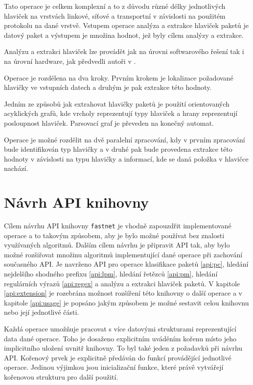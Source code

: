 Tato operace je celkem komplexní a to z důvodu různé délky jednotlivých hlaviček na vrstvách
linkové, síťové a transportní v závislosti na použitém protokolu na dané vrstvě.
Vstupem operace analýza a extrakce hlaviček paketů je datový paket a výstupem je
množina hodnot, jež byly cílem analýzy a extrakce.

Analýzu a extrakci hlaviček lze provádět jak na úrovni softwarového řešení tak i na úrovní hardware,
jak předvedli autoři v \cite{phe}.

Operace je rozdělena na dva kroky. Prvním krokem je lokalizace požadované hlavičky ve vstupních datech
a druhým je pak extrakce této hodnoty.

Jedním ze způsobů jak extrahovat hlavičky paketů je použití orientovaných acyklických grafů,
kde vrcholy reprezentují typy hlaviček a hrany reprezentují posloupnost hlaviček.
Parsovací graf je převeden na konečný automat.

Operace je možné rozdělit na dvě paralelní zpracování,
kdy v prvním zpracování bude identifikován typ hlavičky a v druhé pak bude provedena extrakce
této hodnoty v závislosti na typu hlavičky a informací, kde se daná položka v hlavičce nachází.

\chapter{Návrh API knihovny}\label{chapter:api} %

Cílem návrhu API knihovny \texttt{fastnet} je vhodně zapouzdřit implementované operace a to takovým způsobem,
aby je bylo možné používat bez znalosti využívaných algoritmů. Dalším cílem návrhu je připravit API tak,
aby bylo možné rozšiřovat množinu algoritmů implementující dané operace při zachování
současného API. Je navrženo API pro operace klasifikace paketů \ref{api:pc}, hledání nejdelšího shodného prefixu
\ref{api:lpm}, hledání řetězců \ref{api:pm}, hledání regulárních výrazů \ref{api:regex} a analýzu a
extrakci hlaviček paketů. V kapitole \ref{api:extension} je rozebrána možnost rozšíření této knihovny o další operace a v kapitole \ref{api:usage} je popsáno jakým způsobem je možné sestavit celou knihovnu nebo její jednotlivé
části.

Každá operace umožňuje pracovat s více datovými strukturami reprezentující
data dané operace. Toho je dosaženo explicitním uváděním kořenu místo jeho implicitního uložení
uvnitř knihovny. To byl také jeden z požadavků při návrhu API. Kořenový prvek je
explicitně předáván do funkcí provádějící jednotlivé operace. Jedinou výjimkou
jsou inicializační funkce, které právě vytvářejí kořenovou strukturu pro další použití.

